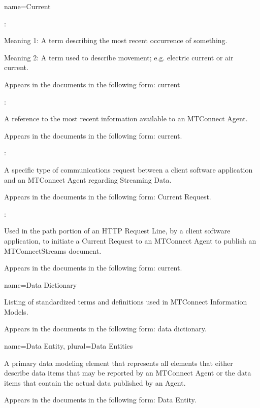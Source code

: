 {
  name={Current}
}
{
	:

	Meaning 1:  A term describing the most recent occurrence of something.

	Meaning 2:  A term used to describe movement; e.g. electric current or air current.

	Appears in the documents in the following form: current

	:

	A reference to the most recent information available to an MTConnect Agent.

	Appears in the documents in the following form: current.

	:

	A specific type of communications request between a client software application and an MTConnect Agent regarding Streaming Data.  

	Appears in the documents in the following form: Current Request.

	:

	Used in the path portion of an HTTP Request Line, by a client software application, to initiate a Current Request to an MTConnect Agent to publish an MTConnectStreams document.

	Appears in the documents in the following form: current.
}


{
  name={Data Dictionary}
}
{
	Listing of standardized terms and definitions used in MTConnect Information Models.

	Appears in the documents in the following form: data dictionary.
}


{
  name={Data Entity},
  plural={Data Entities}
}
{
	A primary data modeling element that represents all elements that either describe data items that may be reported by an MTConnect Agent or the data items that contain the actual data published by an Agent.

	Appears in the documents in the following form: Data Entity.
}


